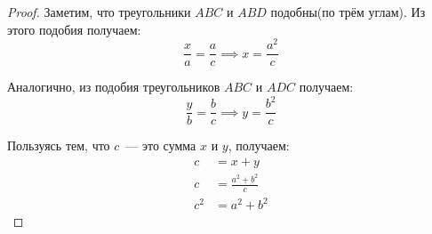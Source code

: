 \documentclass{article}
\begin{document}
\begin{proof}
    Заметим, что треугольники $ABC$ и $ABD$ подобны(по трём углам). Из этого подобия
    получаем:
    \begin{equation*}
      \frac{x}{a} = \frac{a}{c} \implies x = \frac{a^2}{c}
    \end{equation*}

    Аналогично, из подобия треугольников $ABC$ и $ADC$ получаем:
    \begin{equation*}
      \frac{y}{b} = \frac{b}{c} \implies y = \frac{b^2}{c}
    \end{equation*}

    Пользуясь тем, что $c$~--- это сумма $x$ и $y$, получаем:
    \begin{align*}
      c &= x + y \\
      c &= \frac{a^2 + b^2}{c} \\
      c^2 &= a^2 + b^2
    \end{align*}

  \end{proof}
\end{document}
